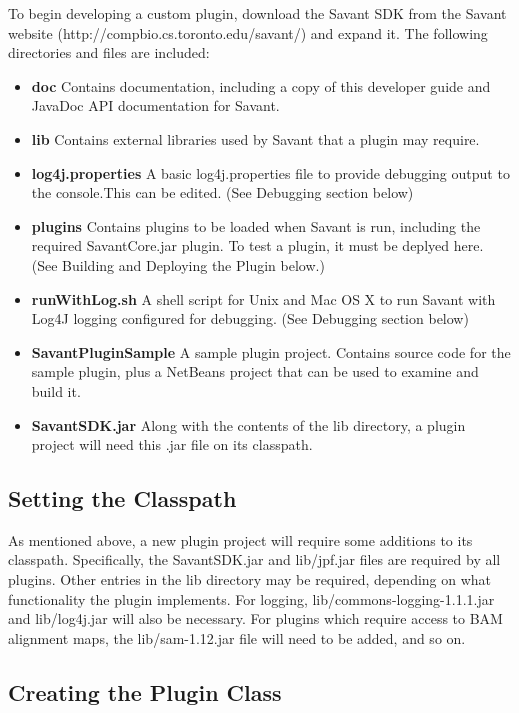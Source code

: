 \documentclass{report}
\begin{document}
To begin developing a custom plugin, download the Savant SDK from the Savant website (http://compbio.cs.toronto.edu/savant/) and expand it. The following directories and files are included:
\begin{itemize}
\item{} {\bf doc} Contains documentation, including a copy of this developer guide and JavaDoc API documentation for Savant.
\item{} {\bf lib} Contains external libraries used by Savant that a plugin may require. 
\item{} {\bf log4j.properties} A basic log4j.properties file to provide debugging output to the console.This can be edited. (See Debugging section below)
\item{} {\bf plugins} Contains plugins to be loaded when Savant is run, including the required SavantCore.jar plugin. To test a plugin, it must be deplyed here. (See Building and Deploying the Plugin below.)
\item{} {\bf runWithLog.sh} A shell script for Unix and Mac OS X to run Savant with Log4J logging configured for debugging. (See Debugging section below)
\item {\bf SavantPluginSample} A sample plugin project. Contains source code for the sample plugin, plus a NetBeans project that can be used to examine and build it.
\item {\bf SavantSDK.jar} Along with the contents of the lib directory, a plugin project will need this .jar file on its classpath.
\end{itemize}

\subsection{Setting the Classpath}

As mentioned above, a new plugin project will require some additions to its classpath. Specifically, the SavantSDK.jar and lib/jpf.jar files are required by all plugins. Other entries in the lib directory may be required, depending on what functionality the plugin implements. For logging, lib/commons-logging-1.1.1.jar and lib/log4j.jar will also be necessary. For plugins which require access to BAM alignment maps, the lib/sam-1.12.jar file will need to be added, and so on.

\subsection{Creating the Plugin Class}
\end{document}

